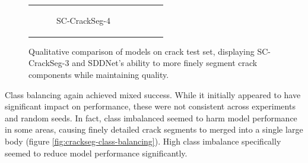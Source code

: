 \documentclass[a4paper,12pt]{report}
\begin{document}
\begin{figure}[htbp]
\begin{tabular}{cccc}
\begin{subfigure}[b]{0.23\textwidth}
            \caption{SC-CrackSeg-4}
            \label{fig:crackseg-experiment-qualitative-sc-crackseg-4}
        \end{subfigure}
    \end{tabular}
    \caption{Qualitative comparison of models on crack test set, displaying SC-CrackSeg-3 and SDDNet's ability to more finely segment crack components while maintaining quality.}
    \label{fig:crackseg-experiment-qualitative}
\end{figure}

Class balancing again achieved mixed success. While it initially appeared to have significant impact on performance, these were not consistent across experiments and random seeds. In fact, class imbalanced seemed to harm model performance in some areas, causing finely detailed crack segments to merged into a single large body (figure \ref{fig:crackseg-class-balancing}). High class imbalance specifically seemed to reduce model performance significantly.
\end{document}
